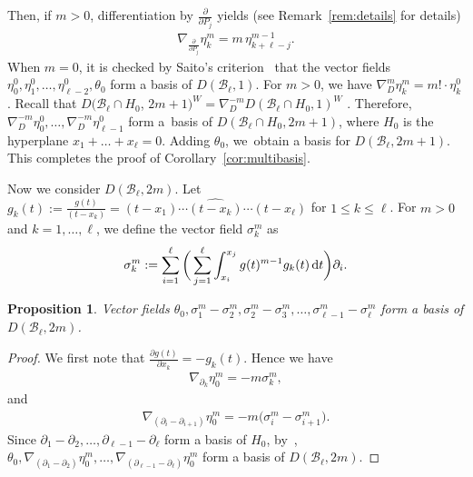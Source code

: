 \documentclass[10pt,a4paper]{amsart}
\numberwithin{equation}{section}
\newtheorem{Proposition}[Theorem]{Proposition}
{ \theoremstyle{definition}
\newtheorem{Definition}[Theorem]{Definition}
\newtheorem{Example}[Theorem]{Example}
\newtheorem{Remark}[Theorem]{Remark} }
\newcommand{\B}{\mathcal{B}}
\begin{document}
Then, if $m>0$, differentiation by $\frac{\partial}{\partial P_j}$ yields
(see Remark~\ref{rem:details} for details)
\begin{gather}
\label{eq:bibun}
\nabla_{\frac{\partial}{\partial P_j}}\eta_k^m=m\,\eta_{k+\ell-j}^{m-1}.
\end{gather}
When $m=0$, it is checked by Saito's criterion~\cite{ot,sai-log} that
the vector fields
$\eta_0^0, \eta_1^0, \dots, \eta_{\ell-2}^0, \theta_0$ form a
basis of $D(\B_\ell, 1)$.
For $m>0$, we have $\nabla_D^m\eta_k^m=m!\cdot\eta_k^0$.
Recall that
$D(\B_\ell\cap H_0$, $2m+1)^W=\nabla_D^{-m}D(\B_\ell\cap H_0, 1)^W$
\cite[Corollary~10]{yos-prim}. Therefore,
$\nabla_D^{-m}\eta_0^0, \dots, \nabla_D^{-m}\eta_{\ell-1}^0$ form a~basis of $D(\B_\ell\cap H_0, 2m+1)$, where $H_0$ is the hyperplane
$x_1+\dots + x_\ell=0$. Adding $\theta_0$, we~obtain a basis for
$D(\B_\ell, 2m+1)$.
This completes the proof of Corollary~\ref{cor:multibasis}.

Now we consider $D(\B_\ell, 2m)$. Let
$g_k(t):=\frac{g(t)}{(t-x_k)}=(t-x_1)\cdots \widehat{(t-x_k)}\cdots (t-x_\ell)$
for $1\leq k\leq \ell$.
For $m>0$ and $k=1, \dots, \ell$, we define the vector field $\sigma_k^m$ as
\begin{gather}
\label{eq:sigma1}
\sigma_k^m:=\sum_{i=1}^\ell\bigg(\sum_{j=1}^\ell\int_{x_i}^{x_j}g(t)^{m-1}g_k(t)\, {\rm d}t \bigg)\partial_i.
\end{gather}

\begin{Proposition}
\label{prop:simpleroots}
Vector fields
$\theta_0, \sigma_1^m-\sigma_2^m, \sigma_2^m-\sigma_3^m, \dots, \sigma_{\ell-1}^m-\sigma_\ell^m$ form a basis of $D(\B_\ell, 2m)$.
\end{Proposition}

\begin{proof}
We first note that $\frac{\partial g(t)}{\partial x_k}=-g_k(t)$. Hence we have
\begin{gather}
\label{eq:differentiate2}
\nabla_{\partial_k}\eta_0^m=-m\sigma_k^m,
\end{gather}
and
\begin{gather*}
\nabla_{(\partial_i-\partial_{i+1})}\eta_0^m=-m\big(\sigma_i^m-\sigma_{i+1}^m\big).
\end{gather*}
Since $\partial_1-\partial_2, \dots, \partial_{\ell-1}-\partial_\ell$
form a basis of $H_0$, by~\cite[Theorem 7]{yos-prim},
$\theta_0,\! \nabla_{\!(\partial_1-\partial_2)}\eta_0^m, \dots,\!
\nabla_{\!(\partial_{\ell-1}-\partial_\ell)}\eta_0^m$
form a basis of $D(\B_\ell, 2m)$.
\end{proof}
\end{document}
